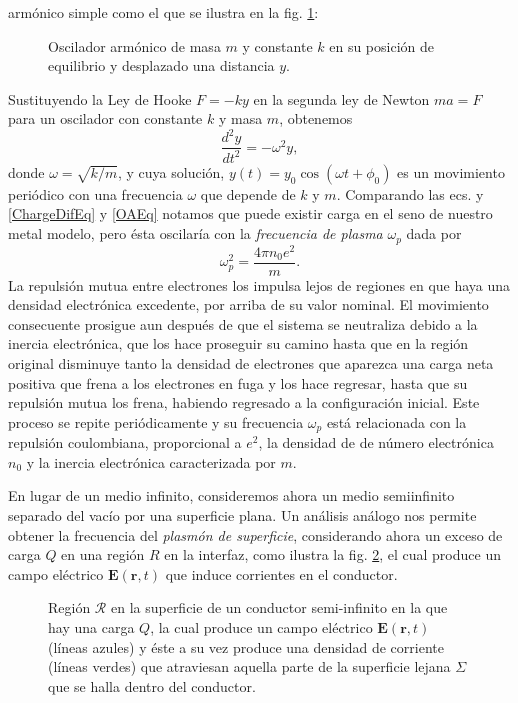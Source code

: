 \documentclass[12pt]{article}
\begin{document}
armónico simple como el que se ilustra en la fig.
\ref{OscArmonicoSimple}:
\begin{figure}
  \centering
  
  \caption{\label{OscArmonicoSimple} Oscilador armónico de masa $m$ y
    constante $k$ en su posición de equilibrio y desplazado una
    distancia $y$.}
\end{figure}
Sustituyendo la Ley de Hooke $F= -ky$ en la segunda ley de Newton
$ma=F$ para un oscilador con constante $k$ y masa $m$, obtenemos
\begin{equation}
  \label{OAEq}
  \frac{d^{2}y}{dt^{2}}=-\omega^2y,
\end{equation}
donde $\omega=\sqrt{k/m}$, y cuya solución,
$y(t)=y_{0}\cos(\omega t+\phi_0)$ es un movimiento periódico con una
frecuencia $\omega$ que depende de $k$ y $m$.  Comparando las ecs.  y
\eqref{ChargeDifEq} y \eqref{OAEq} notamos que puede existir carga en
el seno de nuestro metal modelo, pero ésta oscilaría con la {\em
  frecuencia de plasma} $\omega_p$ dada por
\begin{equation}
  \label{plasmafec}
  \omega _{p}^{2} = \frac{4\pi n_0e^{2}}{m}.
\end{equation}
La repulsión mutua entre electrones los impulsa lejos de regiones en
que haya una densidad electrónica excedente, por arriba de su valor
nominal. El movimiento consecuente prosigue aun después de que el
sistema se neutraliza debido a la inercia electrónica, que los hace
proseguir su camino hasta que en la región original disminuye tanto la
densidad de electrones que aparezca una carga neta positiva que frena
a los electrones en fuga y los hace regresar, hasta que su repulsión
mutua los frena, habiendo regresado a la configuración inicial. Este
proceso se repite periódicamente y su frecuencia $\omega_p$ está
relacionada con la repulsión coulombiana, proporcional a $e^2$, la
densidad de de número electrónica $n_0$ y la inercia electrónica
caracterizada por $m$.

En lugar de un medio infinito, consideremos ahora un medio
semiinfinito separado del vacío por una superficie plana.  Un análisis
análogo nos permite obtener la frecuencia del {\em plasmón de
  superficie}, considerando ahora un exceso de carga $Q$ en una región
$R$ en la interfaz, como ilustra la fig.  \ref{Surfplasmon}, el cual
produce un campo eléctrico $\bm{E}(\bm{r},t)$ que induce corrientes en
el conductor.
\begin{figure}
  \centering
  
  \caption{Región $\mathcal{R}$ en la superficie de un conductor
    semi-infinito en la que hay una carga $Q$, la cual produce un
    campo eléctrico $\bm{E}(\bm{r},t)$ (líneas azules) y éste a su vez
    produce una densidad de corriente (líneas verdes) que atraviesan
    aquella parte de la superficie lejana $\Sigma$ que se halla dentro
    del conductor.}
\label{Surfplasmon}
\end{figure}
\end{document}
